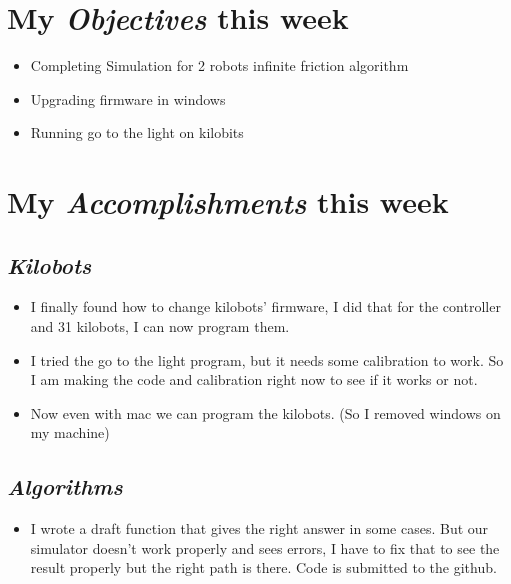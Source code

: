 \newcommand{\handoutName}{Weekly report}
\newcommand{\handoutdate}{\today}


\section{My \emph{Objectives} this week}
\begin{itemize}
\item Completing Simulation for 2 robots infinite friction algorithm
\item Upgrading firmware in windows
\item Running go to the light on kilobits
\end{itemize}



\section{My \emph{Accomplishments} this week}

\subsection{\emph{Kilobots}}

\begin{itemize}
\item I finally found how to change kilobots' firmware, I did that for the controller and 31 kilobots, I can now program them.
\item I tried the go to the light program, but it needs some calibration to work. So I am making the code and calibration right now to see if it works or not.
\item Now even with mac we can program the kilobots. (So I removed windows on my machine)
\end{itemize}

\subsection{\emph{Algorithms}}

\begin{itemize}
\item I wrote a draft function that gives the right answer in some cases. But our simulator doesn't work properly and sees errors, I have to fix that to see the result properly but the right path is there. Code is submitted to the github. 
\end{itemize}





